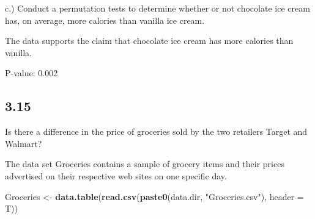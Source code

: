 \documentclass[
  12pt,
]{report}
\newenvironment{Shaded}{\begin{snugshade}}{\end{snugshade}}
\newcommand{\ControlFlowTok}[1]{\textcolor[rgb]{0.13,0.29,0.53}{\textbf{#1}}}
\newcommand{\DataTypeTok}[1]{\textcolor[rgb]{0.13,0.29,0.53}{#1}}
\newcommand{\DecValTok}[1]{\textcolor[rgb]{0.00,0.00,0.81}{#1}}
\newcommand{\FloatTok}[1]{\textcolor[rgb]{0.00,0.00,0.81}{#1}}
\newcommand{\KeywordTok}[1]{\textcolor[rgb]{0.13,0.29,0.53}{\textbf{#1}}}
\newcommand{\NormalTok}[1]{#1}
\newcommand{\OperatorTok}[1]{\textcolor[rgb]{0.81,0.36,0.00}{\textbf{#1}}}
\newcommand{\StringTok}[1]{\textcolor[rgb]{0.31,0.60,0.02}{#1}}
\begin{document}
c.) Conduct a permutation tests to determine whether or not chocolate
ice cream has, on average, more calories than vanilla ice cream.

\begin{Shaded}
\end{Shaded}

The data supports the claim that chocolate ice cream has more calories
than vanilla.

P-value: 0.002

\hypertarget{section-14}{%
\subsection{3.15}\label{section-14}}

Is there a difference in the price of groceries sold by the two
retailers Target and Walmart?

The data set Groceries contains a sample of grocery items and their
prices advertised on their respective web sites on one specific day.

\begin{Shaded}
\begin{Highlighting}[]
\NormalTok{Groceries <-}\StringTok{ }\KeywordTok{data.table}\NormalTok{(}\KeywordTok{read.csv}\NormalTok{(}\KeywordTok{paste0}\NormalTok{(data.dir, }\StringTok{"Groceries.csv"}\NormalTok{),}
                               \DataTypeTok{header =}\NormalTok{ T))}
\end{Highlighting}
\end{Shaded}
\end{document}
